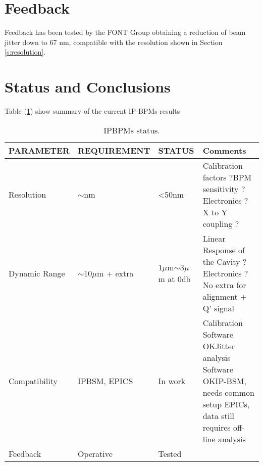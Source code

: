 \section{Feedback}
Feedback has been tested by the FONT Group \cite{FONTfb:2015} obtaining a reduction of beam jitter down to 67 nm, compatible with the resolution shown in Section \ref{s:resolution}.


\section{Status and Conclusions}
Table (\ref{t:IPBPMsStatus}) show summary of the current IP-BPMs results
\begin{table}[hbt]
\centering
\begin{tabular}{l|l|l|p{4cm}}\hline
PARAMETER & REQUIREMENT & STATUS & Comments\\\hline\hline
Resolution & $\sim$nm & <50nm & Calibration factors ?\newline BPM sensitivity ?\newline Electronics ? \newline X to Y coupling ?\\\hline
Dynamic Range & $\sim$10$\mu$m + extra & $1\mu$m$\sim3\mu$m at 0db & Linear Response of the Cavity ?\newline Electronics ?\newline No extra for alignment + Q' signal \\\hline
Compatibility & IPBSM, EPICS & In work &Calibration Software OK\newline Jitter analysis Software OK\newline IP-BSM, needs common setup \newline EPICs, data still requires off-line analysis\\\hline
Feedback & Operative & Tested	& \\\hline
\end{tabular}\caption{IPBPMs status.}\label{t:IPBPMsStatus}
\end{table}